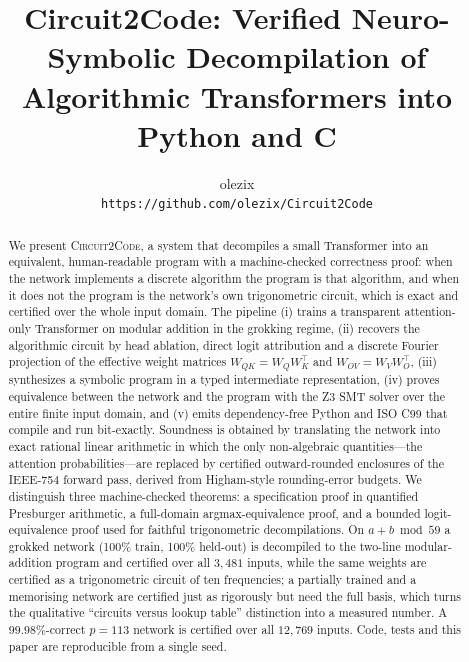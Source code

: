 \documentclass[11pt]{article}
\title{\textbf{Circuit2Code}: Verified Neuro-Symbolic Decompilation of\\
Algorithmic Transformers into Python and C}
\author{%
  olezix\\
  \texttt{https://github.com/olezix/Circuit2Code}
}
\date{}
\newcommand{\WQK}{W_{QK}}
\newcommand{\WOV}{W_{OV}}
\begin{document}
\maketitle

\begin{abstract}
We present \textsc{Circuit2Code}, a system that decompiles a small Transformer
into an equivalent, human-readable program with a machine-checked correctness
proof: when the network implements a discrete algorithm the program is that
algorithm, and when it does not the program is the network's own trigonometric
circuit, which is exact and certified over the whole input domain. The pipeline (i) trains a
transparent attention-only Transformer on modular addition in the grokking
regime, (ii) recovers the algorithmic circuit by head ablation, direct logit
attribution and a discrete Fourier projection of the effective weight matrices
$\WQK = W_Q W_K^\top$ and $\WOV = W_V W_O^\top$, (iii) synthesizes a symbolic
program in a typed intermediate representation, (iv) proves equivalence between
the network and the program with the Z3 SMT solver over the entire finite input
domain, and (v) emits dependency-free Python and ISO C99 that compile and run
bit-exactly. Soundness is obtained by translating the network into exact rational
linear arithmetic in which the only non-algebraic quantities---the attention
probabilities---are replaced by certified outward-rounded enclosures of the
IEEE-754 forward pass, derived from Higham-style rounding-error budgets. We
distinguish three machine-checked theorems: a specification proof in quantified
Presburger arithmetic, a full-domain argmax-equivalence proof, and a bounded
logit-equivalence proof used for faithful trigonometric decompilations. On
$a+b \bmod 59$ a grokked network (100\% train, 100\% held-out) is decompiled to
the two-line modular-addition program and certified over all $3{,}481$ inputs,
while the same weights are certified as a trigonometric circuit of ten
frequencies; a partially trained and a memorising
network are certified just as rigorously but need the full basis, which turns
the qualitative ``circuits versus lookup table'' distinction into a measured
number. A $99.98\%$-correct $p=113$ network is certified over all $12{,}769$
inputs. Code, tests and this paper are reproducible from a single seed.
\end{abstract}

\end{document}
